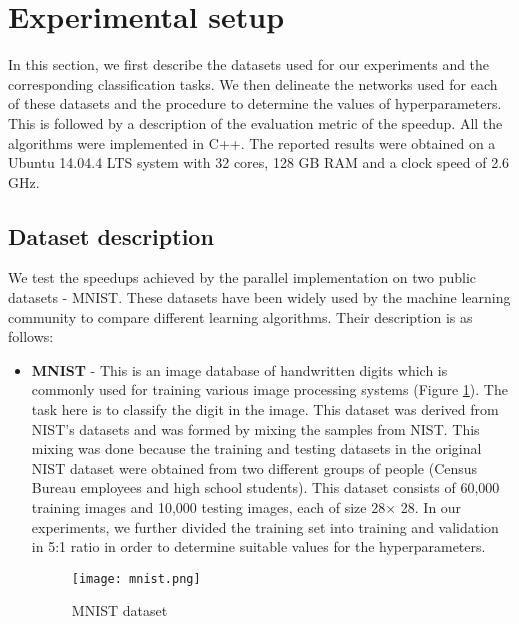 \section{Experimental setup}
\label{Exp}
In this section, we first describe the datasets used for our experiments and the corresponding classification tasks. We then delineate the networks used for each of these datasets and the procedure to determine the values of hyperparameters. This is followed by a description of the evaluation metric of the speedup. All the algorithms were implemented in C++. The reported results were obtained on a Ubuntu 14.04.4 LTS system with 32 cores, 128 GB RAM and a clock speed of 2.6 GHz.  

\subsection{Dataset description}
\label{sub:data_desc}
We test the speedups achieved by the parallel implementation on two public datasets - MNIST. These datasets have been widely used by the machine learning community to compare different learning algorithms. Their description is as follows:

\begin{itemize}
\item \textbf{MNIST} - This is an image database of handwritten digits which is commonly used for training various image processing systems (Figure \ref{fig:mnist}). The task here is to classify the digit in the image. This dataset was derived from NIST's datasets and was formed by mixing the samples from NIST. This mixing was done because the training and testing datasets in the original NIST dataset were obtained from two different groups of people (Census Bureau employees and high school students). This dataset consists of 60,000 training images and 10,000 testing images, each of size 28$\times$ 28. In our experiments, we further divided the training set into training and validation in 5:1 ratio in order to determine suitable values for the hyperparameters.

\begin{figure}
  \centering
       \texttt{[image: mnist.png]}
  \caption{MNIST dataset}
  \label{fig:mnist}
\end{figure}

\end{itemize}

